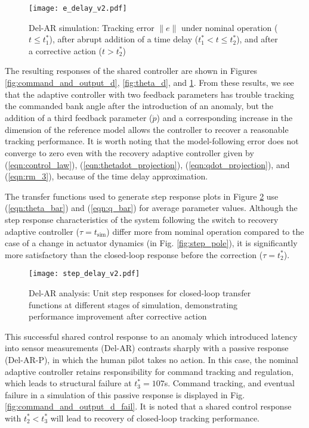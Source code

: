 \begin{figure}[h!]
	\centering
	\texttt{[image: e\_delay\_v2.pdf]}
	\caption{Del-AR simulation: Tracking error $\|e\|$ under nominal operation ($t \leq t_1^*$), after abrupt addition of a time delay ($t_1^* < t \leq t_2^*$), and after a corrective action ($t > t_2^*$)}
	\label{fig:error_d}
\end{figure}

The resulting responses of the shared controller are shown in Figures \ref{fig:command_and_output_d}, \ref{fig:theta_d}, and \ref{fig:error_d}. From these results, we see that the adaptive controller with two feedback parameters has trouble tracking the commanded bank angle after the introduction of an anomaly, but the addition of a third feedback parameter ($\hat{\dot{p}}$) and a corresponding increase in the dimension of the reference model allows the controller to recover a reasonable tracking performance. It is worth noting that the model-following error does not converge to zero even with the recovery adaptive controller given by (\ref{eqn:control_law}), (\ref{eqn:thetadot_projection}), (\ref{eqn:qdot_projection}), and (\ref{eqn:rm_3}), because of the time delay approximation. 

The transfer functions used to generate step response plots in Figure \ref{fig:step_delay} use (\ref{eqn:theta_bar}) and (\ref{eqn:q_bar}) for average parameter values. Although the step response characteristics of the system following the switch to recovery adaptive controller ($\tau = t_{\textrm{sim}}$) differ more from nominal operation compared to the case of a change in actuator dynamics (in Fig. \ref{fig:step_pole}), it is significantly more satisfactory than the closed-loop response before the correction ($\tau = t_2^*$).

\begin{figure}[h!]
	\centering
	\texttt{[image: step\_delay\_v2.pdf]}
	\caption{Del-AR analysis: Unit step responses for closed-loop transfer functions at different stages of simulation, demonstrating performance improvement after corrective action}
	\label{fig:step_delay}
\end{figure}

This successful shared control response to an anomaly which introduced latency into sensor measurements (Del-AR) contrasts sharply with a passive response (Del-AR-P), in which the human pilot takes no action. In this case, the nominal adaptive controller retains responsibility for command tracking and regulation, which leads to structural failure at $t_3^* = 107$s. Command tracking, and eventual failure in a simulation of this passive response is displayed in Fig. \ref{fig:command_and_output_d_fail}. It is noted that a shared control response with $t_2^* < t_3^*$ will lead to recovery of closed-loop tracking performance. 

